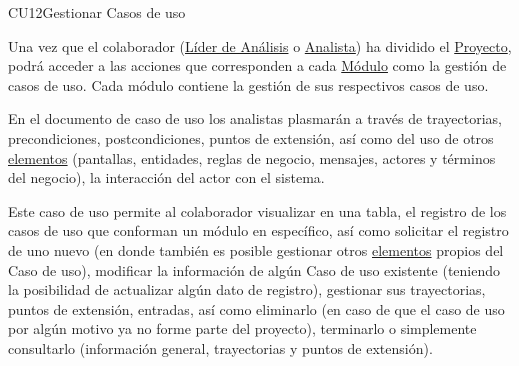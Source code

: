 	\begin{UseCase}{CU12}{Gestionar Casos de uso}{
			Una vez que el colaborador (\hyperlink{jefe}{Líder de Análisis} o \hyperlink{analista}{Analista}) ha dividido el \hyperlink{proyectoEntidad}{Proyecto}, podrá acceder a las acciones que corresponden a cada \hyperlink{moduloEntidad}{Módulo} como la gestión de casos de uso.  Cada módulo contiene la gestión de sus respectivos casos de uso.
			
			En el documento de caso de uso los analistas plasmarán a través de trayectorias, precondiciones, postcondiciones, puntos de extensión, así como del uso de otros \hyperlink{tElemento}{elementos} (pantallas, entidades, reglas de negocio, mensajes, actores y términos del negocio), la interacción del actor con el sistema. 
			
			Este caso de uso permite al colaborador visualizar en una tabla, el registro de los casos de uso que conforman un módulo en específico, así como solicitar el registro de uno nuevo (en donde también es posible gestionar otros \hyperlink{tElemento}{elementos} propios del Caso de uso), modificar la información de algún Caso de uso existente (teniendo la posibilidad de actualizar algún dato de registro), gestionar sus trayectorias, puntos de extensión, entradas, así como eliminarlo (en caso de que el caso de uso por algún motivo ya no forme parte del proyecto), terminarlo o simplemente consultarlo (información general, trayectorias y puntos de extensión). \\
	}

\end{UseCase}

